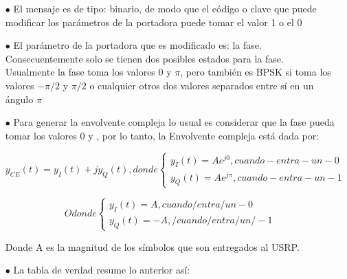 \begin{itemize}
	\item [$\bullet$] El mensaje es de tipo: binario, de modo que el código o clave que puede modificar los parámetros de la portadora puede tomar el valor 1 o el 0
	\item [$\bullet$] El parámetro de la portadora que es modificado es: la fase. Consecuentemente solo se tienen dos posibles estados para la fase. Usualmente la fase toma los valores 0 y $\pi$, pero también es BPSK si toma los valores $-\pi/2$ y $\pi/2$ o cualquier otros dos valores separados entre sí en un ángulo $\pi$ 
	\item [$\bullet$] Para generar la envolvente compleja lo usual es considerar que la fase pueda tomar los valores 0 y , por lo tanto, la Envolvente compleja está dada por:
	
 \begin{equation} \label{capcuatro_cuatro}
			 y_{CE}(t) = y_{I}(t) +j y_{Q}(t), donde  \begin{cases}  y_{I}(t) = Ae^{j0}, cuando- entra- un -0\\ y_{Q}(t) = Ae^{j\pi}, cuando- entra- un -1
			\end{cases}
\end{equation}

 \begin{equation} \label{capcuatro_cinco}
	O donde  \begin{cases}  y_{I}(t) = A, cuando / entra / un -0\\ y_{Q}(t) = -A, / cuando / entra / un  / -1
	\end{cases}
\end{equation}

Donde A es la magnitud de los símbolos que son entregados al USRP.
	\item [$\bullet$] La tabla de verdad resume lo anterior así:
	

\end{itemize}
